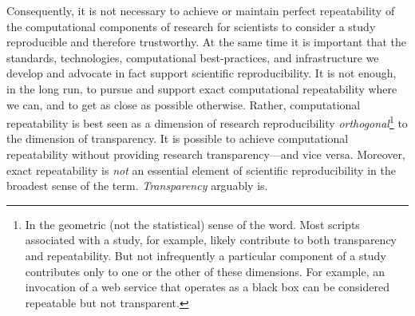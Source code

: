 Consequently, it is not necessary to achieve or
	maintain perfect repeatability of the computational components of research for scientists to
	consider a study reproducible and therefore trustworthy.
At the same time it is important that the standards, technologies,
	computational best-practices, and infrastructure we develop and advocate in fact support scientific reproducibility.
It is not enough, in the long run, to pursue and support exact computational repeatability where we can,
	and to get as close as possible otherwise.
Rather, computational repeatability is best seen as a dimension of research reproducibility
	\emph{orthogonal}\footnote{In the geometric (not the statistical) sense of the word.
	Most scripts associated with a study, for example, likely contribute to both transparency and repeatability.
    But not infrequently a particular component of a study contributes only to one or the other
	of these dimensions. For example, an invocation of a web service that
    operates as a black box can be considered repeatable but not transparent.}
	to the dimension of transparency.
It is possible to achieve computational repeatability without providing research transparency---and vice versa.
Moreover, exact repeatability is \emph{not} an essential element of
scientific reproducibility in the broadest sense of the term. \emph{Transparency} arguably is.


